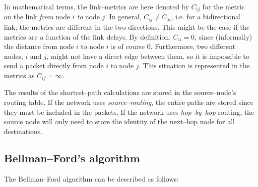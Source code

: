\documentclass[a4paper]{article}
\begin{document}

In mathematical terms, the link--metrics are here denoted by $C_{ij}$
for the metric on the link \emph{from} node $i$ \emph{to} node $j$. In
general, $C_{ij}\ne{}C_{ji}$, i.e. for a bidirectional link, the
metrics are different in the two directions. This might be the case if
the metrics are a function of the link delays. By definition,
$C_{ii}=0$, since (informally) the distance from node $i$ to node $i$ is of course 0. Furthermore, two different nodes, $i$ and $j$, might not have a direct edge between them, so it is impossible to send a packet directly from node $i$ to node $j$.
This situation is represented in the metrics as $C_{ij}=\infty$.

The results of the shortest--path calculations are stored in the
source--node's routing table. If the network uses
\emph{source--routing}, the entire paths are stored since they
must be included in the packets. If the network uses
\emph{hop--by--hop} routing, the source node will only need to
store the identity of the next--hop node for all destinations.

\subsection{Bellman--Ford's algorithm}
The Bellman--Ford algorithm can be described as follows:

\setlength{\fboxsep}{9pt}
\begin{center}\noindent{}
\end{center}
\end{document}
